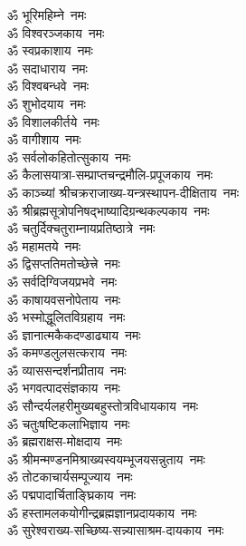 \begin{multicols}{2}
\begin{flushleft}
        ॐ भूरिमहिम्ने~नमः\\
        ॐ विश्वरञ्जकाय~नमः\\
        ॐ स्वप्रकाशाय~नमः\\
        ॐ सदाधाराय~नमः\\
        ॐ विश्वबन्धवे~नमः\\
        ॐ शुभोदयाय~नमः\\
        ॐ विशालकीर्तये~नमः\\
        ॐ वागीशाय~नमः\\
        ॐ सर्वलोकहितोत्सुकाय~नमः\\
        ॐ कैलासयात्रा-सम्प्राप्त\-चन्द्र\-मौलि-प्रपूजकाय~नमः\hfill{}\\
                                        
        ॐ काञ्च्यां श्रीचक्रराजाख्य-यन्त्रस्थापन-दीक्षिताय~नमः\\
        ॐ श्रीब्रह्मसूत्रोपनिषद्\-भाष्यादि\-ग्रन्थ\-कल्पकाय~नमः\\
        ॐ चतुर्दिक्चतुराम्नायप्रतिष्ठात्रे~नमः\\
        ॐ महामतये~नमः\\
        ॐ द्विसप्ततिमतोच्छेत्त्रे~नमः\\
        ॐ सर्वदिग्विजयप्रभवे~नमः\\
        ॐ काषायवसनोपेताय~नमः\\
        ॐ भस्मोद्धूलितविग्रहाय~नमः\\
        ॐ ज्ञानात्मकैकदण्डाढ्याय~नमः\\
        ॐ कमण्डलुलसत्कराय~नमः\hfill{}\\
                                        
        ॐ व्याससन्दर्शनप्रीताय~नमः\\
        ॐ भगवत्पादसंज्ञकाय~नमः\\
        ॐ सौन्दर्यलहरी\-मुख्य\-बहु\-स्तोत्र\-विधाय\-काय~नमः\\
        ॐ चतुःषष्टिकलाभिज्ञाय~नमः\\
        ॐ ब्रह्मराक्षस-मोक्षदाय~नमः\\
        ॐ श्रीमन्मण्डन\-मिश्राख्य\-स्वयम्भू\-जय\-सन्नुताय~नमः\\
        ॐ तोटकाचार्यसम्पूज्याय~नमः\\
        ॐ पद्मपादार्चिताङ्घ्रिकाय~नमः\\
        ॐ हस्तामलक\-योगीन्द्र\-ब्रह्म\-ज्ञान\-प्रदायकाय~नमः\\
        ॐ सुरेश्वराख्य-सच्छिष्य-सन्न्यासाश्रम-दायकाय~नमः\hfill{}\\
                        

\end{flushleft}
\end{multicols}
